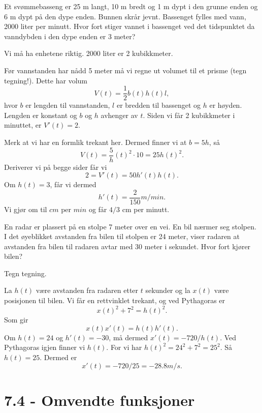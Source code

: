 \documentclass[11pt, norsk]{article}
\begin{document}
\begin{oppg}
Et svømmebasseng er 25 m langt, 10 m bredt og 1 m dypt i den grunne enden og 6 m dypt på den dype enden. Bunnen skrår jevnt. Bassenget fylles med vann, 2000 liter per minutt. Hvor fort stiger vannet i bassenget ved det tidspunktet da vanndybden i den dype enden er 3 meter?
\end{oppg}

\begin{losn}
Vi må ha enhetene riktig. 2000 liter er 2 kubikkmeter. 

Før vannstanden har nådd 5 meter må vi regne ut volumet til et prisme (tegn tegning!). Dette har volum 
$$
V(t) = \frac 12 b(t)h(t)l,
$$
hvor $b$ er lengden til vannstanden, $l$ er bredden til bassenget og $h$ er høyden. Lengden er konstant og $b$ og $h$ avhenger av $t$. Siden vi får 2 kubikkmeter i minuttet, er $V'(t)=2$.

Merk at vi har en formlik trekant her. Dermed finner vi at $b=5h$, så
$$
V(t) =  \frac 5h(t)^2 \cdot 10 = 25h(t)^2.
$$
Deriverer vi på begge sider får vi
$$
2 = V'(t) = 50h'(t)h(t).
$$
Om $h(t)=3$, får vi dermed
$$
h'(t) = \frac{2}{150} m/min.
$$
Vi gjør om til $cm$ per $min$ og får $4/3$ cm per minutt.
\end{losn}


\begin{oppg}[7.2.13]
En radar er plassert på en stolpe 7 meter over en vei. En bil nærmer seg stolpen. I det øyeblikket avstanden fra bilen til stolpen er 24 meter, viser radaren at avstanden fra bilen til radaren avtar med 30 meter i sekundet. Hvor fort kjører bilen?
\end{oppg}
\begin{losn}
Tegn tegning.

La $h(t)$ være avstanden fra radaren etter $t$ sekunder og la $x(t)$ være posisjonen til bilen. Vi får en rettvinklet trekant, og ved Pythagoras er 
$$
x(t)^2 + 7^2 = h(t)^2.
$$
Som gir
$$
x(t)x'(t) = h(t)h'(t).
$$
Om $h(t)=24$ og $h'(t)=-30$, må dermed $x'(t) = -720/h(t)$. Ved Pythagoras igjen finner vi $h(t)$. For vi har $h(t)^2=24^2+7^2=25^2$. Så $h(t)=25$. Dermed er
$$
x'(t) = -720/25 = -28.8 m/s.
$$

\end{losn}


\section{7.4 - Omvendte funksjoner}
\end{document}
